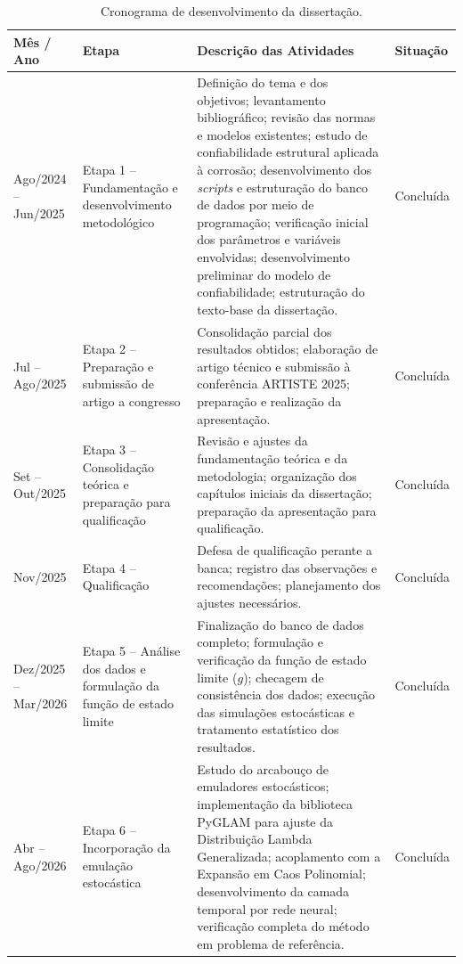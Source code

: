 \begin{table}[H]
\centering
\footnotesize
\caption{Cronograma de desenvolvimento da dissertação.}
\label{tab:cronograma}
\renewcommand{\arraystretch}{1.3}
\setlength{\extrarowheight}{2pt}
\begin{tabular}{>{\raggedright\arraybackslash}p{2.2cm} >{\raggedright\arraybackslash}p{3.4cm} >{\raggedright\arraybackslash}p{7.2cm} >{\raggedright\arraybackslash}p{1.8cm}}
\toprule
\textbf{Mês / Ano} & \textbf{Etapa} & \textbf{Descrição das Atividades} & \textbf{Situação} \\
\midrule

Ago/2024 – Jun/2025 &
Etapa 1 – Fundamentação e desenvolvimento metodológico &
Definição do tema e dos objetivos; levantamento bibliográfico; revisão das normas e modelos existentes; estudo de confiabilidade estrutural aplicada à corrosão; desenvolvimento dos \textit{scripts} e estruturação do banco de dados por meio de programação; verificação inicial dos parâmetros e variáveis envolvidas; desenvolvimento preliminar do modelo de confiabilidade; estruturação do texto-base da dissertação. &
Concluída \\

Jul – Ago/2025 &
Etapa 2 – Preparação e submissão de artigo a congresso &
Consolidação parcial dos resultados obtidos; elaboração de artigo técnico e submissão à conferência ARTISTE 2025; preparação e realização da apresentação. &
Concluída \\

Set – Out/2025 &
Etapa 3 – Consolidação teórica e preparação para qualificação &
Revisão e ajustes da fundamentação teórica e da metodologia; organização dos capítulos iniciais da dissertação; preparação da apresentação para qualificação. &
Concluída \\

Nov/2025 &
Etapa 4 – Qualificação &
Defesa de qualificação perante a banca; registro das observações e recomendações; planejamento dos ajustes necessários. &
Concluída \\

Dez/2025 – Mar/2026 &
Etapa 5 – Análise dos dados e formulação da função de estado limite &
Finalização do banco de dados completo; formulação e verificação da função de estado limite ($g$); checagem de consistência dos dados; execução das simulações estocásticas e tratamento estatístico dos resultados. &
Concluída \\

Abr – Ago/2026 &
Etapa 6 – Incorporação da emulação estocástica &
Estudo do arcabouço de emuladores estocásticos; implementação da biblioteca PyGLAM para ajuste da Distribuição Lambda Generalizada; acoplamento com a Expansão em Caos Polinomial; desenvolvimento da camada temporal por rede neural; verificação completa do método em problema de referência. &
Concluída \\


\end{tabular}
\end{table}
